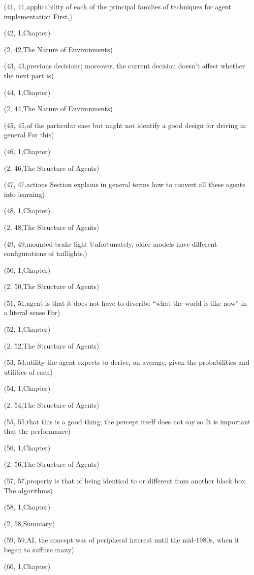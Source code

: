(41, 41,applicability of each of the principal families of techniques for agent implementation First,)

(42, 1,Chapter)

(2, 42,The Nature of Environments)

(43, 43,previous decisions; moreover, the current decision doesn’t affect whether the next part is)

(44, 1,Chapter)

(2, 44,The Nature of Environments)

(45, 45,of the particular case but might not identify a good design for driving in general For this)

(46, 1,Chapter)

(2, 46,The Structure of Agents)

(47, 47,actions Section  explains in general terms how to convert all these agents into learning)

(48, 1,Chapter)

(2, 48,The Structure of Agents)

(49, 49,mounted brake light Unfortunately, older models have different conﬁgurations of taillights,)

(50, 1,Chapter)

(2, 50,The Structure of Agents)

(51, 51,agent is that it does not have to describe “what the world is like now” in a literal sense For)

(52, 1,Chapter)

(2, 52,The Structure of Agents)

(53, 53,utility the agent expects to derive, on average, given the probabilities and utilities of each)

(54, 1,Chapter)

(2, 54,The Structure of Agents)

(55, 55,that this is a good thing; the percept itself does not say so It is important that the performance)

(56, 1,Chapter)

(2, 56,The Structure of Agents)

(57, 57,property is that of being identical to or different from another black box The algorithms)

(58, 1,Chapter)

(2, 58,Summary)

(59, 59,AI, the concept was of peripheral interest until the mid-1980s, when it began to suffuse many)

(60, 1,Chapter)

